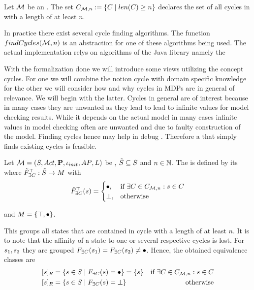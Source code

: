 \documentclass[preview]{standalone}
\begin{document}
\begin{definition}
	Let ${{{\mathcal{M}}}}$ be an \chgphN. The set ${{C}_{{{\mathcal{M}}}, n}} := \{ {C} \mid {len}({C}) \geq n\}$ declares the set of all cycles in \chgph with a length of at least $n$.
\end{definition}

In practice there exist several cycle finding algorithms. The function ${findCycles}({{{\mathcal{M}}}}, n)$ is an abstraction for one of these algorithms being used. The actual implementation relys on algorithms of the Java library \jgrapht \cite{Michail2020} namely the 

With the formalization done we will introduce some views utilizing the concept cycles. For one we will combine the notion cycle with domain specific knowledge for the other we will consider how and why cycles in MDPs are in general of relevance. We will begin with the latter. Cycles in general are of interest because in many cases they are unwanted as they lead to lead to infinite values for model checking results. While it depends on the actual model in many cases infinite values in model checking often are unwanted and due to faulty construction of the model. Finding cycles hence may help in debug \achgphN. Therefore a \viewN that simply finds existing cycles is feasible.


\begin{definition}
	Let ${{{\mathcal{M}}}} = {{({S}, {Act}, {\textbf{P}}, {\iota_{init}}, {AP}, {L})}}$ be \achgphN, ${\tilde{{S}}} \subseteq {S}$ and $n \in {\mathbb{N}}$. The \viewN \viewhascycle is defined by its \grpfctN \gfcthascycle where ${{\tilde{F}_{{\exists{C}}}}^{\top}} : {\tilde{{S}}} \to {\ensuremath{{M}}}$ with
	\[
	\gfctsubhascycle(\state) =
	\begin{cases}
			\remelem, &\text{if } \exists \cycle \in \cycleset : \state \in \cycle \\
			\notppty, &\text{otherwise}
		\end{cases}
	\]
	
	and ${{M}} = \{{\top}, {\bullet}\}$.
\end{definition}

This \viewN groups all states that are contained in cycle with a length of at least $n$. It is to note that the affinity of a state to one or several respective cycles is lost. For ${s}_1, {s}_2$ they are grouped ${{F_{{\exists{C}}}}}({s}_1) = {{F_{{\exists{C}}}}}({s}_2) \neq {\bullet}$. Hence, the obtained equivalence classes are
\begin{align*}
	\eqclassv &= \{\state \in \states \mid \gfcthascycle(\state) = \remelem\} = \{\state\} &\text{if } \exists \cycle \in \cycleset : \state \in \cycle \\
	\eqclassv &= \{\state \in \states \mid \gfcthascycle(\state) = \notppty\} &\text{otherwise}
\end{align*}
\end{document}
